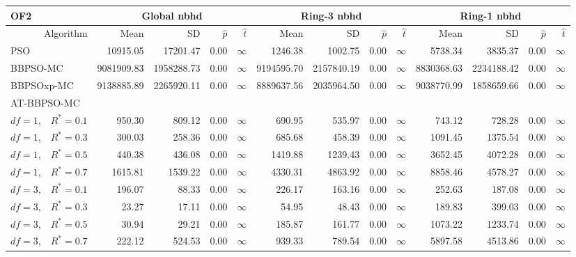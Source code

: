 \documentclass[cmbright]{staauth}
\begin{document}
\begin{table}[ht]
\centering
\tiny{
\begin{tabular}{r|rrrr|rrrr|rrrr}
\multicolumn{1}{l}{OF2} & \multicolumn{4}{c}{Global nbhd} & \multicolumn{4}{c}{Ring-3 nbhd} & \multicolumn{4}{c}{Ring-1 nbhd}\\
  \hline
Algorithm & Mean & SD & $\widehat{p}$ & $\widehat{t}$ & Mean & SD & $\widehat{p}$ & $\widehat{t}$ & Mean & SD & $\widehat{p}$ & $\widehat{t}$ \\
  \hline
\multicolumn{1}{l|}{PSO} & 10915.05 & 17201.47 & 0.00 & $\infty$ & 1246.38 & 1002.75 & 0.00 & $\infty$ & 5738.34 & 3835.37 & 0.00 & $\infty$ \\
  \multicolumn{1}{l|}{BBPSO-MC} & 9081909.83 & 1958288.73 & 0.00 & $\infty$ & 9194595.70 & 2157840.19 & 0.00 & $\infty$ & 8830368.63 & 2234188.42 & 0.00 & $\infty$ \\
  \multicolumn{1}{l|}{BBPSOxp-MC} & 9138885.89 & 2265920.11 & 0.00 & $\infty$ & 8889637.56 & 2035964.50 & 0.00 & $\infty$ & 9038770.99 & 1858659.66 & 0.00 & $\infty$ \\
\hline
\multicolumn{1}{l|}{AT-BBPSO-MC} &&&&&&&&&&&&\\
  $df = 1,\enspace$ $R^* =0.1$ & 950.30 & 809.12 & 0.00 & $\infty$ & 690.95 & 535.97 & 0.00 & $\infty$ & 743.12 & 728.28 & 0.00 & $\infty$ \\
  $df = 1,\enspace$ $R^* =0.3$ & 300.03 & 258.36 & 0.00 & $\infty$ & 685.68 & 458.39 & 0.00 & $\infty$ & 1091.45 & 1375.54 & 0.00 & $\infty$ \\
  $df = 1,\enspace$ $R^* =0.5$ & 440.38 & 436.08 & 0.00 & $\infty$ & 1419.88 & 1239.43 & 0.00 & $\infty$ & 3652.45 & 4072.28 & 0.00 & $\infty$ \\
  $df = 1,\enspace$ $R^* =0.7$ & 1615.81 & 1539.22 & 0.00 & $\infty$ & 4330.31 & 4863.92 & 0.00 & $\infty$ & 8858.46 & 4578.27 & 0.00 & $\infty$ \\
  $df = 3,\enspace$ $R^* =0.1$ & 196.07 & 88.33 & 0.00 & $\infty$ & 226.17 & 163.16 & 0.00 & $\infty$ & 252.63 & 187.08 & 0.00 & $\infty$ \\
  $df = 3,\enspace$ $R^* =0.3$ & 23.27 & 17.11 & 0.00 & $\infty$ & 54.95 & 48.43 & 0.00 & $\infty$ & 189.83 & 399.03 & 0.00 & $\infty$ \\
  $df = 3,\enspace$ $R^* =0.5$ & 30.94 & 29.21 & 0.00 & $\infty$ & 185.87 & 161.77 & 0.00 & $\infty$ & 1073.22 & 1233.74 & 0.00 & $\infty$ \\
  $df = 3,\enspace$ $R^* =0.7$ & 222.12 & 524.53 & 0.00 & $\infty$ & 939.33 & 789.54 & 0.00 & $\infty$ & 5897.58 & 4513.86 & 0.00 & $\infty$ \\

\end{tabular}}
\end{table}
\end{document}
